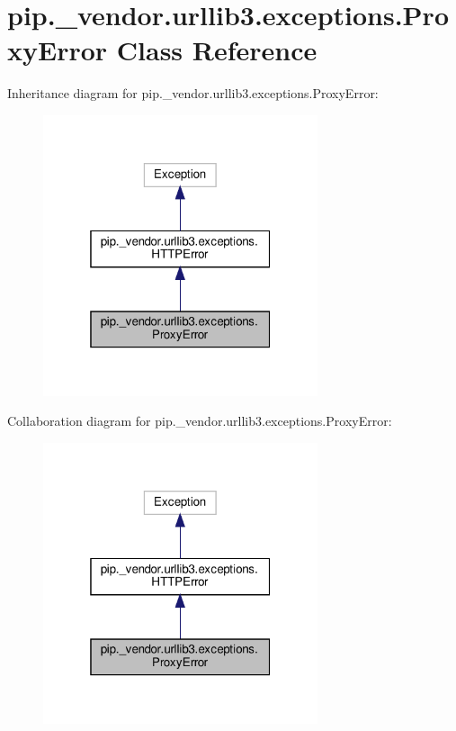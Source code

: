 \hypertarget{classpip_1_1__vendor_1_1urllib3_1_1exceptions_1_1ProxyError}{}\section{pip.\+\_\+vendor.\+urllib3.\+exceptions.\+Proxy\+Error Class Reference}
\label{classpip_1_1__vendor_1_1urllib3_1_1exceptions_1_1ProxyError}


Inheritance diagram for pip.\+\_\+vendor.\+urllib3.\+exceptions.\+Proxy\+Error\+:
\nopagebreak
\begin{figure}[H]
\begin{center}
\leavevmode
\includegraphics[width=229pt]{classpip_1_1__vendor_1_1urllib3_1_1exceptions_1_1ProxyError__inherit__graph}
\end{center}
\end{figure}


Collaboration diagram for pip.\+\_\+vendor.\+urllib3.\+exceptions.\+Proxy\+Error\+:
\nopagebreak
\begin{figure}[H]
\begin{center}
\leavevmode
\includegraphics[width=229pt]{classpip_1_1__vendor_1_1urllib3_1_1exceptions_1_1ProxyError__coll__graph}
\end{center}
\end{figure}
